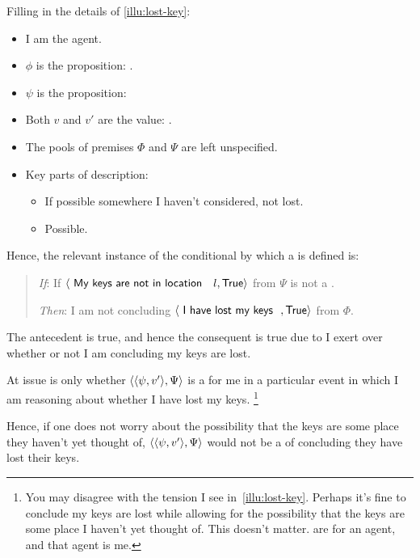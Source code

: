 \begin{note}
  Filling in the details of \autoref{illu:lost-key}:
  \begin{itemize}[noitemsep]
  \item
    I am the agent.
  \item
    \(\phi\) is the proposition: .
  \item
    \(\psi\) is the proposition: 
  \item
    Both \(v\) and \(v'\) are the value: .
  \item
    The pools of premises \(\Phi\) and \(\Psi\) are left unspecified.
  \item
    Key parts of description:
    \begin{itemize}
    \item
      If possible somewhere I haven't considered, not lost.
    \item
      Possible.
    \end{itemize}
  \end{itemize}

  Hence, the relevant instance of the conditional by which a \requ{} is defined is:

  \begin{quote}
    \begin{itenum}
    \item[\emph{If}:]
      If \(\pv{\propI{My keys are not in location }l}{\valI{True}}\) from \(\Psi\) is not a \fc{}.
    \item[\emph{Then}:]
      I am not concluding \(\pv{\propI{I have lost my keys}}{\valI{True}}\) from \(\Phi\).
    \end{itenum}
  \end{quote}

  The antecedent is true, and hence the consequent is true due to \ninf{} I exert over whether or not I am concluding my keys are lost.
\end{note}

\begin{note}
  At issue is only whether \(\langle \langle \psi, v' \rangle, \Psi \rangle\) is a \requ{} for me in a particular event in which I am reasoning about whether I have lost my keys.%
  \footnote{
    You may disagree with the tension I see in~\autoref{illu:lost-key}.
    Perhaps it's fine to conclude my keys are lost while allowing for the possibility that the keys are some place I haven't yet thought of.
    This doesn't matter.
     are for an agent, and that agent is me.
  }

  Hence, if one does not worry about the possibility that the keys are some place they haven't yet thought of, \(\langle \langle \psi, v' \rangle, \Psi \rangle\) would not be a  of concluding they have lost their keys.
\end{note}

